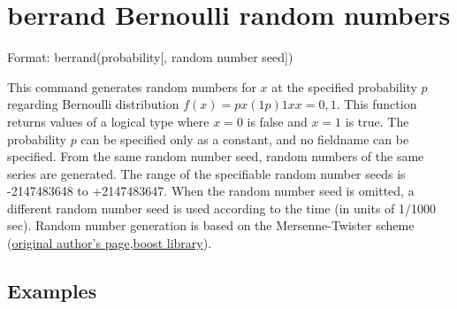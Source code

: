 
%

\section{berrand Bernoulli random numbers\label{sect:berrand}}
Format: berrand(probability[, random number seed])

This command generates random numbers for $x$ at the specified probability $p$ regarding Bernoulli distribution $f(x) = px(1p)1xx = 0,1$. This function returns values of a logical type where $x=0$ is false and $x=1$ is true. The probability $p$ can be specified only as a constant, and no fieldname can be specified. 
From the same random number seed, random numbers of the same series are generated. The range of the specifiable random number seeds is -2147483648 to +2147483647.
When the random number seed is omitted, a different random number seed is used according to the time (in units of 1/1000 sec).
Random number generation is based on the Mersenne-Twister scheme (\href{http://www.math.sci.hiroshima-u.ac.jp/~m-mat/MT/emt.html}{original author’s page},\href{http://www.boost.org/doc/libs/1_54_0/doc/html/boost_random.html}{boost library}).

\subsection*{Examples}


%
